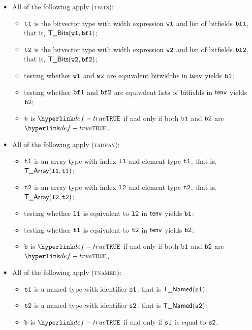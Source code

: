 \documentclass{book}
\newcommand\ProseOrTypeError[0]{\ProseTerminateAs{\TypeErrorConfig}}
\begin{document}
\begin{itemize}
  \item All of the following apply (\textsc{tbits}):
  \begin{itemize}
    \item $\texttt{t1}$ is the bitvector type with width expression $\texttt{w1}$ and list of bitfields $\texttt{bf1}$, that is, $\textsf{T\_Bits}(\texttt{w1}, \texttt{bf1})$;
    \item $\texttt{t2}$ is the bitvector type with width expression $\texttt{w2}$ and list of bitfields $\texttt{bf2}$, that is, $\textsf{T\_Bits}(\texttt{w2}, \texttt{bf2})$;
    \item testing whether $\texttt{w1}$ and $\texttt{w2}$ are equivalent bitwidths in $\textsf{tenv}$ yields $\texttt{b1}$\ProseOrTypeError;
    \item testing whether $\texttt{bf1}$ and $\texttt{bf2}$ are equivalent lists of bitfields in $\textsf{tenv}$ yields $\texttt{b2}$\ProseOrTypeError;
    \item $\texttt{b}$ is $\True$ if and only if both $\texttt{b1}$ and $\texttt{b2}$ are $\True$.
  \end{itemize}

  \item All of the following apply (\textsc{tarray}):
  \begin{itemize}
    \item $\texttt{t1}$ is an array type with index $\texttt{l1}$ and element type $\texttt{t1}$, that is, $\textsf{T\_Array}(\texttt{l1}, \texttt{t1})$;
    \item $\texttt{t2}$ is an array type with index $\texttt{l2}$ and element type $\texttt{t2}$, that is, $\textsf{T\_Array}(\texttt{l2}, \texttt{t2})$;
    \item testing whether $\texttt{l1}$ is equivalent to $\texttt{l2}$ in $\textsf{tenv}$ yields $\texttt{b1}$\ProseOrTypeError;
    \item testing whether $\texttt{t1}$ is equivalent to $\texttt{t2}$ in $\textsf{tenv}$ yields $\texttt{b2}$\ProseOrTypeError;
    \item $\texttt{b}$ is $\True$ if and only if both $\texttt{b1}$ and $\texttt{b2}$ are $\True$.
  \end{itemize}

  \item All of the following apply (\textsc{tnamed}):
  \begin{itemize}
    \item $\texttt{t1}$ is a named type with identifier $\texttt{s1}$, that is $\textsf{T\_Named}(\texttt{s1})$;
    \item $\texttt{t2}$ is a named type with identifier $\texttt{s2}$, that is $\textsf{T\_Named}(\texttt{s2})$;
    \item $\texttt{b}$ is $\True$ if and only if $\texttt{s1}$ is equal to $\texttt{s2}$.
  \end{itemize}


\end{itemize}
\end{document}
